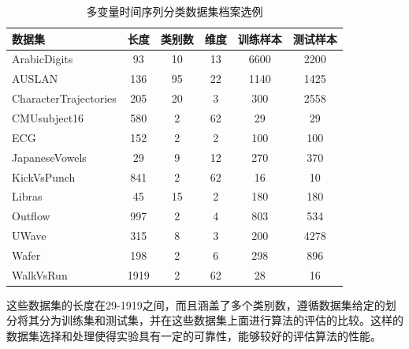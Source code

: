 \begin{table}[h!]
    \centering
    \caption{多变量时间序列分类数据集档案选例}
    \label{tab:multivariate_tsc_archive}
    \begin{tabular}{lccccc} %
        \toprule
        \textbf{数据集}          & \textbf{长度} & \textbf{类别数} & \textbf{维度} & \textbf{训练样本} & \textbf{测试样本} \\
        \midrule
        ArabicDigits          & 93          & 10           & 13          & 6600          & 2200          \\
        AUSLAN                & 136         & 95           & 22          & 1140          & 1425          \\
        CharacterTrajectories & 205         & 20           & 3           & 300           & 2558          \\
        CMUsubject16          & 580         & 2            & 62          & 29            & 29            \\
        ECG                   & 152         & 2            & 2           & 100           & 100           \\
        JapaneseVowels        & 29          & 9            & 12          & 270           & 370           \\
        KickVsPunch           & 841         & 2            & 62          & 16            & 10            \\
        Libras                & 45          & 15           & 2           & 180           & 180           \\
        Outflow               & 997         & 2            & 4           & 803           & 534           \\
        UWave                 & 315         & 8            & 3           & 200           & 4278          \\
        Wafer                 & 198         & 2            & 6           & 298           & 896           \\
        WalkVsRun             & 1919        & 2            & 62          & 28            & 16            \\
        \bottomrule
    \end{tabular}
\end{table}

这些数据集的长度在29-1919之间，而且涵盖了多个类别数，遵循数据集给定的划分将其分为训练集和测试集，并在这些数据集上面进行算法的评估的比较。这样的数据集选择和处理使得实验具有一定的可靠性，能够较好的评估算法的性能。
